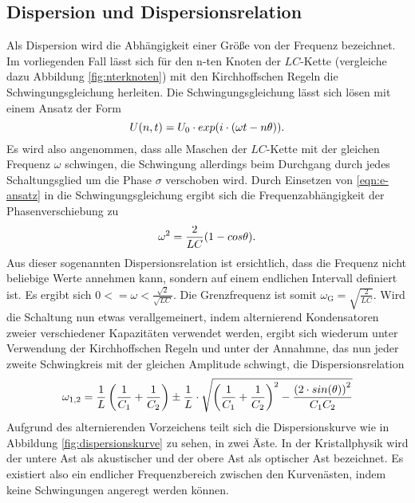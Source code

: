 \subsection{Dispersion und Dispersionsrelation}
\label{subsec-dispersion}
Als Dispersion wird die Abhängigkeit einer Größe von der Frequenz bezeichnet.
Im vorliegenden Fall lässt sich für den n-ten Knoten der $LC$-Kette (vergleiche dazu
Abbildung \eqref{fig:nterknoten}) mit den Kirchhoffschen Regeln die Schwingungsgleichung herleiten.
Die Schwingungsgleichung lässt sich lösen mit einem Ansatz der Form
\begin{equation}
\centering
U(n,t)=U_{\mathrm{0}} \cdot exp(i\cdot( \omega t- n\theta )).
\label{eqn:e-ansatz}
\end{equation}
Es wird also angenommen, dass alle Maschen der $LC$-Kette mit der gleichen Frequenz $\omega$ schwingen, die Schwingung allerdings beim Durchgang durch jedes Schaltungsglied um die Phase $\sigma$ verschoben wird.
Durch Einsetzen von \eqref{eqn:e-ansatz} in die Schwingungsgleichung ergibt sich die Frequenzabhängigkeit der Phasenverschiebung zu
\begin{equation}
\centering
\omega^2=\frac{2}{LC}(1-cos{\theta}).
\label{eqn:dispersion}
\end{equation}
Aus dieser sogenannten Dispersionsrelation ist ersichtlich, dass die Frequenz \omega nicht beliebige Werte annehmen kann,
sondern auf einem endlichen Intervall definiert ist.
Es ergibt sich $0<=\omega<\frac{\sqrt{2}}{\sqrt{LC}}$.
Die Grenzfrequenz ist somit $\omega_{\mathrm{G}}=\sqrt{\frac{2}{LC}}$.
Wird die Schaltung nun etwas verallgemeinert, indem alternierend Kondensatoren zweier verschiedener Kapazitäten verwendet werden,
ergibt sich wiederum unter Verwendung der Kirchhoffschen Regeln und unter der Annahmne, das nun jeder zweite Schwingkreis mit der gleichen Amplitude
schwingt, die Dispersionsrelation
\begin{equation}
  \centering
 \omega_{1,2}=\frac{1}{L}\left ( \frac{1}{C_{\mathrm{1}}}+\frac{1}{C_{\mathrm{2}}} \right ) \pm \frac{1}{L} \cdot \sqrt{\left ( \frac{1}{C_{\mathrm{1}}}+\frac{1}{C_{\mathrm{2}}} \right )^2-\frac{\left(2\cdot sin(\theta)\right)^2}{C_{\mathrm{1}}C_{\mathrm{2}}}}
  \label{eqn:dispersion2}
\end{equation}
Aufgrund des alternierenden Vorzeichens teilt sich die Dispersionskurve wie in Abbildung \ref{fig:dispersionskurve} zu sehen, in zwei Äste.
In der Kristallphysik wird der untere Ast als akustischer und der obere Ast als optischer Ast bezeichnet.
Es existiert also ein endlicher Frequenzbereich zwischen den Kurvenästen, indem keine Schwingungen angeregt werden können.

